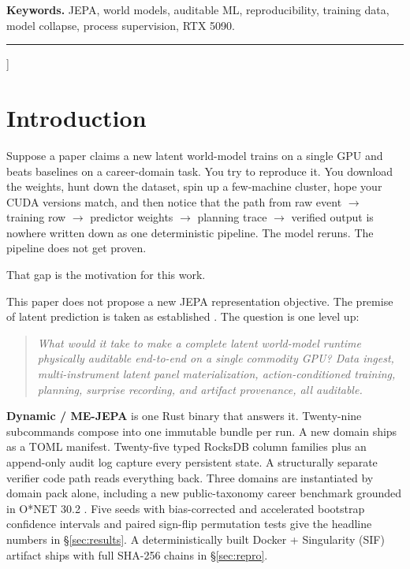 \documentclass[10pt,twocolumn,letterpaper]{article}
\begin{document}
\begin{onecolabstract}
  \vspace{4pt}
  \noindent\textbf{Keywords.} JEPA, world models, auditable ML,
  reproducibility, training data, model collapse, process
  supervision, RTX 5090.
  \end{onecolabstract}
  \vspace{6pt}
  \rule{\textwidth}{0.4pt}
  \vspace{8pt}
]

\section{Introduction}
\label{sec:intro}

Suppose a paper claims a new latent world-model trains on a single
GPU and beats baselines on a career-domain task. You try to
reproduce it. You download the weights, hunt down the dataset, spin
up a few-machine cluster, hope your CUDA versions match, and then
notice that the path from raw event $\to$ training row $\to$
predictor weights $\to$ planning trace $\to$ verified output is
nowhere written down as one deterministic pipeline. The model
reruns. The pipeline does not get proven.

That gap is the motivation for this work.

This paper does not propose a new JEPA representation objective.
The premise of latent prediction is taken as established
\cite{assran2023ijepa,bardes2024vjepa,lecun2022path}. The question
is one level up:
\begin{quote}
\itshape
What would it take to make a complete latent world-model runtime
physically auditable end-to-end on a single commodity GPU? Data
ingest, multi-instrument latent panel materialization,
action-conditioned training, planning, surprise recording, and
artifact provenance, all auditable.
\end{quote}

\textbf{Dynamic / ME-JEPA} is one Rust binary that answers it.
Twenty-nine subcommands compose into one immutable bundle per run.
A new domain ships as a TOML manifest. Twenty-five typed RocksDB
column families plus an append-only audit log capture every
persistent state. A structurally separate verifier code path reads
everything back. Three domains are instantiated by domain pack
alone, including a new public-taxonomy career benchmark grounded in
O*NET 30.2 \cite{onet2026}. Five seeds with bias-corrected and
accelerated bootstrap confidence intervals
\cite{efron2020automatic} and paired sign-flip permutation tests
give the headline numbers in \S\ref{sec:results}. A
deterministically built Docker + Singularity (SIF) artifact ships
with full SHA-256 chains in \S\ref{sec:repro}.
\end{document}
